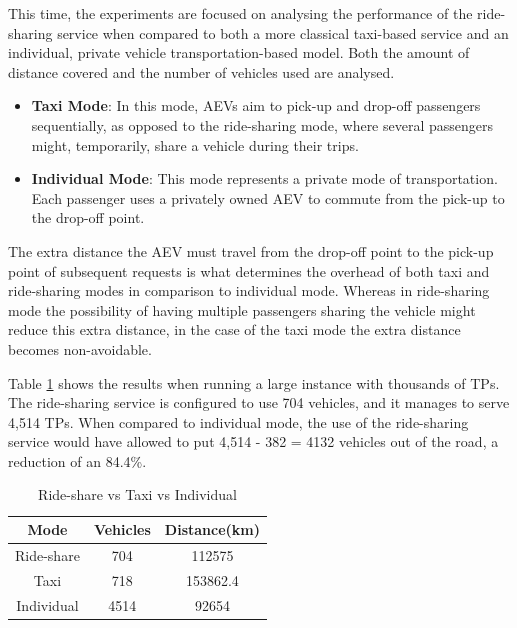 This time, the experiments are focused on analysing the performance of the ride-sharing service when compared to both a more classical taxi-based service and an individual, private vehicle transportation-based model. Both the amount of distance covered and the number of vehicles used are analysed.
\begin{itemize}
\item \textbf{Taxi Mode}: In this mode, AEVs aim to pick-up and drop-off passengers sequentially, as opposed to the ride-sharing  mode, where several passengers might, temporarily, share a vehicle during their trips. 
\item \textbf{Individual Mode}: This mode represents a private mode of transportation. Each passenger uses a privately owned AEV to commute from the pick-up to the drop-off point.  
\end{itemize}

The extra distance the AEV must travel from the drop-off point to the pick-up point of subsequent requests is what determines the overhead of both taxi and ride-sharing modes in comparison to individual mode. Whereas in ride-sharing mode the possibility of having multiple passengers sharing the vehicle  might reduce this extra distance, in the case of the taxi mode the extra distance becomes non-avoidable. 


Table \ref{last_table} shows the results 
when running a large instance with thousands of TPs. The ride-sharing service is configured to use 704 vehicles, and it manages to serve 4,514 TPs. When compared to individual mode, 
the use of the ride-sharing service would have allowed to put 4,514 - 382  = 4132 vehicles out of the road, a reduction of an 84.4\%. 
\begin{table}[b]
\centering
\begin{tabular}{|c|c|c|}
 \hline
  \textbf{Mode} & \textbf{Vehicles} & \textbf{Distance(km)} \\
 \hline
   Ride-share & 704 & 112575 \\
 \hline
   Taxi & 718 & 153862.4  \\
 \hline
  Individual & 4514 & 92654 \\
 \hline
\end{tabular}
\caption{Ride-share vs Taxi vs  Individual}\label{tab:comparision} 
\label{last_table}
\end{table}

